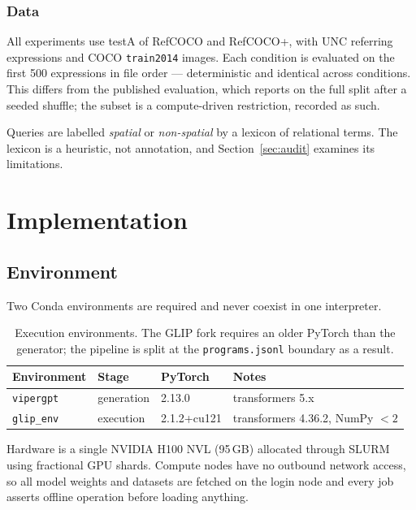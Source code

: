 \documentclass[12pt,a4paper,oneside]{report}
\begin{document}
\subsection{Data}

All experiments use testA of RefCOCO and RefCOCO+, with UNC referring expressions and
COCO \texttt{train2014} images. Each condition is evaluated on the first 500
expressions in file order --- deterministic and identical across conditions. This
differs from the published evaluation, which reports on the full split after a seeded
shuffle; the subset is a compute-driven restriction, recorded as such.

Queries are labelled \emph{spatial} or \emph{non-spatial} by a lexicon of relational
terms. The lexicon is a heuristic, not annotation, and Section~\ref{sec:audit}
examines its limitations.






\chapter{Implementation}
\label{ch:implementation}

\section{Environment}

Two Conda environments are required and never coexist in one interpreter.

\begin{table}[htbp]\centering
\caption{Execution environments. The GLIP fork requires an older PyTorch than the
generator; the pipeline is split at the \texttt{programs.jsonl} boundary as a result.}
\label{tab:envs}
\begin{tabular}{@{}llll@{}}
\toprule
\textbf{Environment} & \textbf{Stage} & \textbf{PyTorch} & \textbf{Notes} \\
\midrule
\texttt{vipergpt} & generation & 2.13.0 & transformers 5.x \\
\texttt{glip\_env} & execution & 2.1.2+cu121 & transformers 4.36.2, NumPy $<2$ \\
\bottomrule
\end{tabular}
\end{table}

Hardware is a single NVIDIA H100 NVL (95\,GB) allocated through SLURM using fractional
GPU shards. Compute nodes have no outbound network access, so all model weights and
datasets are fetched on the login node and every job asserts offline operation before
loading anything.
\end{document}
